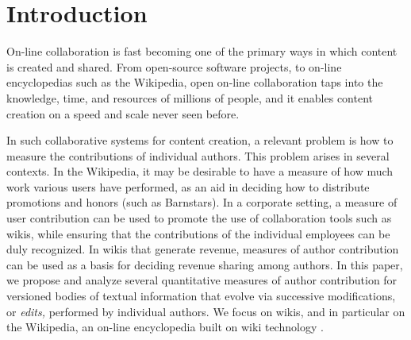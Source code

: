 
\section{Introduction}

On-line collaboration is fast becoming one of the primary ways in
which content is created and shared.
From open-source software projects, to on-line encyclopedias such as
the Wikipedia, open on-line collaboration taps into the knowledge,
time, and resources of millions of people, and it enables content
creation on a speed and scale never seen before.

In such collaborative systems for content creation, a relevant 
problem is how to measure the contributions of individual authors. 
This problem arises in several contexts.
In the Wikipedia, it may be desirable to have a measure of how much
work various users have performed, as an aid in deciding how to
distribute promotions and honors (such as Barnstars). 
In a corporate setting, a measure of user contribution can be used to
promote the use of collaboration tools such as wikis, while ensuring
that the contributions of the individual employees can be duly
recognized. 
In wikis that generate revenue, measures of author contribution can be
used as a basis for deciding revenue sharing among authors. 
In this paper, we propose and analyze several quantitative measures of
author contribution for versioned bodies of textual information that
evolve via successive modifications, or {\em edits,} performed by
individual authors. 
We focus on wikis, and in particular on the Wikipedia, an on-line
encyclopedia built on wiki technology \cite{Wikis01}. 

